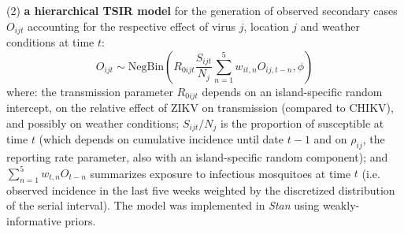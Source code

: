 \documentclass[a0paper,portrait]{baposter}
\begin{document}
\begin{poster}
{\begin{flushleft}
(2) \textbf{a hierarchical TSIR model} \cite{perkins_estimating_2015} for the generation of observed secondary cases $O_{ijt}$ accounting for the respective effect of virus $j$, location $j$ and weather conditions at time $t$:
\begin{equation*}
O_{ijt} \sim \mbox{NegBin} \left(R_{0ijt} \frac{S_{ijt}}{N_j}\sum_{n=1}^5 w_{it,n} O_{ij,t-n}, \phi \right)
\end{equation*}
where:  the transmission parameter $R_{0ijt}$ depends on an island-specific random intercept, on the relative effect of ZIKV on transmission (compared to CHIKV), and possibly on weather conditions;
$S_{ijt} / N_j$ is the proportion of susceptible at time $t$ (which depends on cumulative incidence until date $t-1$ and on $\rho_{ij}$, the reporting rate parameter, also with an island-specific random component);
and $\sum_{n=1}^5 w_{t,n} O_{t-n}$ summarizes exposure to infectious mosquitoes at time $t$ (i.e. observed incidence in the last five weeks weighted by the discretized distribution of the serial interval).
The model was implemented in \textit{Stan}\cite{carpenter2015stan} using weakly-informative priors.


\end{flushleft}
}


%


\end{poster}
\end{document}
